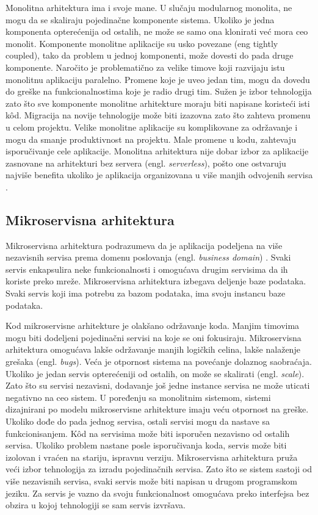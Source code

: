 \documentclass[12pt,oneside]{memoir}
\begin{document}
Monolitna arhitektura ima i svoje mane. U slučaju modularnog monolita, ne mogu da se skaliraju pojedinačne komponente sistema. Ukoliko je jedna komponenta opterećenija od ostalih, ne može se samo ona klonirati već mora ceo monolit. Komponente monolitne aplikacije su usko povezane (eng tightly coupled), tako da problem u jednoj komponenti, može dovesti do pada druge komponente. Naročito je problematično za velike timove koji razvijaju istu monolitnu aplikaciju paralelno. Promene koje je uveo jedan tim, mogu da dovedu do greške na funkcionalnostima koje je radio drugi tim. Sužen je izbor tehnologija zato što sve komponente monolitne arhitekture moraju biti napisane koristeći isti kôd. Migracija na novije tehnologije može biti izazovna zato što zahteva promenu u celom projektu. Velike monolitne aplikacije su komplikovane za održavanje i mogu da smanje produktivnost na projektu. Male promene u kodu, zahtevaju isporučivanje cele aplikacije. Monolitna arhitektura nije dobar izbor za aplikacije zasnovane na arhitekturi bez servera (engl. \emph{serverless}), pošto one ostvaruju najviše benefita ukoliko je aplikacija organizovana u više manjih odvojenih servisa \cite{sa}.

\subsection{Mikroservisna arhitektura}
Mikroservisna arhitektura podrazumeva da je aplikacija podeljena na više nezavisnih servisa prema domenu poslovanja (engl. \emph{business domain}) \cite{bm}. Svaki servis enkapsulira neke funkcionalnosti i omogućava drugim servisima da ih koriste preko mreže. Mikroservisna arhitektura izbegava deljenje baze podataka. Svaki servis koji ima potrebu za bazom podataka, ima svoju instancu baze podataka. 

Kod mikroservisne arhitekture je olakšano održavanje koda. Manjim timovima mogu biti dodeljeni pojedinačni servisi na koje se oni fokusiraju. Mikroservisna arhitektura omogućava lakše održavanje manjih logičkih celina, lakše nalaženje grešaka (engl. \emph{bugs}). Veća je otpornost sistema na povećanje dolaznog saobraćaja. Ukoliko je jedan servis opterećeniji od ostalih, on može se skalirati (engl. \emph{scale}). Zato što su servisi nezavisni, dodavanje još jedne instance servisa ne može uticati negativno na ceo sistem. U poređenju sa monolitnim sistemom, sistemi dizajnirani po modelu mikroservisne arhitekture imaju veću otpornost na greške. Ukoliko dođe do pada jednog servisa, ostali servisi mogu da nastave sa funkcionisanjem. Kôd na servisima može biti isporučen nezavisno od ostalih servisa. Ukoliko problem nastane posle isporučivanja koda, servis može biti izolovan i vraćen na stariju, ispravnu verziju. Mikroservisna arhitektura pruža veći izbor tehnologija za izradu pojedinačnih servisa. Zato što se sistem sastoji od više nezavisnih servisa, svaki servis može biti napisan u drugom programskom jeziku. Za servis je vazno da svoju funkcionalnost omogućava preko interfejsa bez obzira u kojoj tehnologiji se sam servis izvršava.
\end{document}
